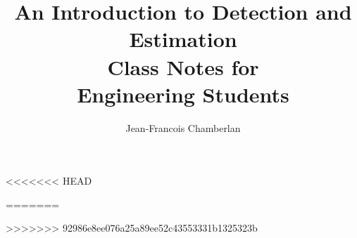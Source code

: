 \documentclass[12pt,openany]{book}
\begin{document}
\author{Jean-Francois Chamberlan}
\title{
\Huge{An Introduction to Detection and Estimation}\\[5mm]
\Large{Class Notes for\\Engineering Students}}

\frontmatter
\maketitle




%

\mainmatter

%
<<<<<<< HEAD

%
%
=======
%
%
%

>>>>>>> 92986e8ee076a25a89ee52c43553331b1325323b

\end{document}
